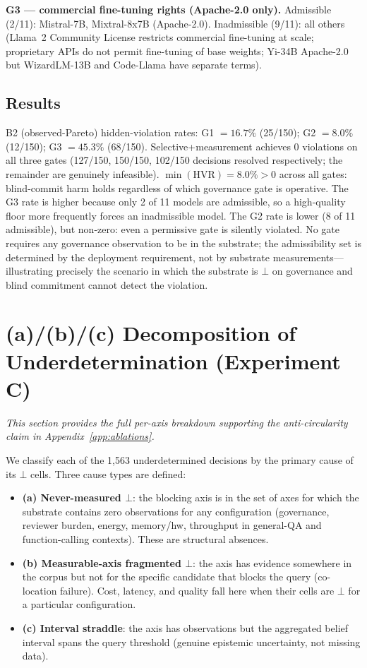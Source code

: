 \documentclass{article} %
\newcommand{\bbot}{\bot}
\begin{document}
\textbf{G3 — commercial fine-tuning rights (Apache-2.0 only).}
Admissible (2/11): Mistral-7B, Mixtral-8x7B (Apache-2.0).
Inadmissible (9/11): all others (Llama~2 Community License restricts commercial fine-tuning at scale; proprietary APIs do not permit fine-tuning of base weights; Yi-34B Apache-2.0 but WizardLM-13B and Code-Llama have separate terms).

\subsection*{Results}
B2 (observed-Pareto) hidden-violation rates: G1 $= 16.7\%$ (25/150); G2 $= 8.0\%$ (12/150); G3 $= 45.3\%$ (68/150).
Selective+measurement achieves 0 violations on all three gates (127/150, 150/150, 102/150 decisions resolved respectively; the remainder are genuinely infeasible).
$\min(\text{HVR}) = 8.0\% > 0$ across all gates: blind-commit harm holds regardless of which governance gate is operative.
The G3 rate is higher because only 2 of 11 models are admissible, so a high-quality floor more frequently forces an inadmissible model.
The G2 rate is lower (8 of 11 admissible), but non-zero: even a permissive gate is silently violated.
No gate requires any governance observation to be in the substrate; the admissibility set is determined by the deployment requirement, not by substrate measurements---illustrating precisely the scenario in which the substrate is $\bbot$ on governance and blind commitment cannot detect the violation.

\section{(a)/(b)/(c) Decomposition of Underdetermination (Experiment C)}
\label{app:circularity_detail}

\emph{This section provides the full per-axis breakdown supporting the anti-circularity claim in Appendix~\ref{app:ablations}.}

We classify each of the 1{,}563 underdetermined decisions by the primary cause of its $\bbot$ cells.
Three cause types are defined:

\begin{itemize}
  \item \textbf{(a) Never-measured $\bbot$}: the blocking axis is in the set of axes for which the substrate contains zero observations for any configuration (governance, reviewer burden, energy, memory/hw, throughput in general-QA and function-calling contexts). These are structural absences.
  \item \textbf{(b) Measurable-axis fragmented $\bbot$}: the axis has evidence somewhere in the corpus but not for the specific candidate that blocks the query (co-location failure). Cost, latency, and quality fall here when their cells are $\bbot$ for a particular configuration.
  \item \textbf{(c) Interval straddle}: the axis has observations but the aggregated belief interval spans the query threshold (genuine epistemic uncertainty, not missing data).
\end{itemize}
\end{document}
